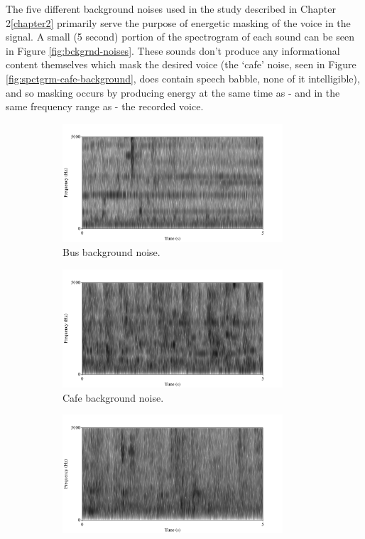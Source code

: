 \documentclass[dissertation,copyright]{uathesis}
\begin{document}
The five different background noises used in the study described in Chapter 2\ref{chapter2} primarily serve the purpose of energetic masking of the voice in the signal.  A small (5 second) portion of the spectrogram of each sound can be seen in Figure \ref{fig:bckgrnd-noises}.  These sounds don't produce any informational content themselves which mask the desired voice (the `cafe' noise, seen in Figure \ref{fig:spctgrm-cafe-background}, does contain speech babble, none of it intelligible), and so masking occurs by producing energy at the same time as - and in the same frequency range as - the recorded voice.
%
\begin{figure}
\begin{subfigure}{0.5\textwidth}
  \centering
  \includegraphics[width=0.9\textwidth]{figure/spctgrm-bus-background.png}
  \caption{Bus background noise.}
  \label{fig:bus-bkgrnd}
\end{subfigure}
\begin{subfigure}{0.5\textwidth}
  \centering
  \includegraphics[width=0.9\textwidth]{figure/spctgrm-cafe-background.png}
  \caption{Cafe background noise.}
  \label{fig:cafe-bkgrnd}
\end{subfigure}%
\hfill
\begin{subfigure}{0.5\textwidth}
  \centering
  \includegraphics[width=0.9\textwidth]{figure/spctgrm-ped-background.png}

\end{subfigure}
\end{figure}
\end{document}
